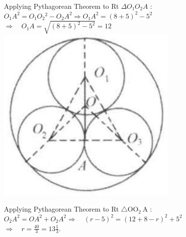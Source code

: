 \documentclass{article}
\begin{document}
Applying Pythagorean Theorem to Rt \(\Delta O_{1} O_{2} A\) :\\
\(O_{1} A^{2}=O_{1} O_{2}{ }^{2}-O_{2} A^{2} \Rightarrow O_{1} A^{2}=(8+5)^{2}-5^{2}\)\\
\(\Rightarrow \quad O_{1} A=\sqrt{(8+5)^{2}-5^{2}}=12\)\\
\centering
\includegraphics[width=\textwidth]{images/180(1).jpg}

Applying Pythagorean Theorem to Rt \(\triangle \mathrm{OO}_{2} \mathrm{~A}\) :\\
\(O_{2} A^{2}=O A^{2}+O_{2} A^{2} \Rightarrow \quad(r-5)^{2}=(12+8-r)^{2}+5^{2}\)\\
\(\Rightarrow \quad r=\frac{40}{3}=13 \frac{1}{3}\).\\
\end{document}
